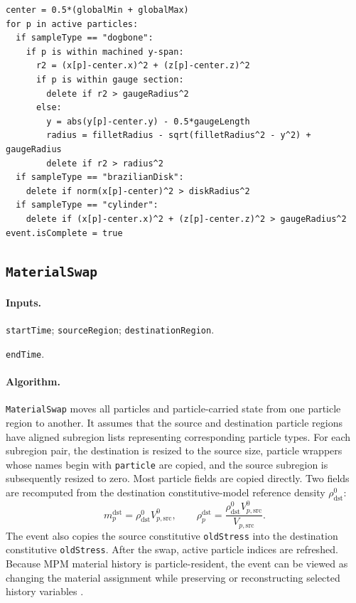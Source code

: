 \begin{lstlisting}[caption={MachineSample event pseudocode.}]
center = 0.5*(globalMin + globalMax)
for p in active particles:
  if sampleType == "dogbone":
    if p is within machined y-span:
      r2 = (x[p]-center.x)^2 + (z[p]-center.z)^2
      if p is within gauge section:
        delete if r2 > gaugeRadius^2
      else:
        y = abs(y[p]-center.y) - 0.5*gaugeLength
        radius = filletRadius - sqrt(filletRadius^2 - y^2) + gaugeRadius
        delete if r2 > radius^2
  if sampleType == "brazilianDisk":
    delete if norm(x[p]-center)^2 > diskRadius^2
  if sampleType == "cylinder":
    delete if (x[p]-center.x)^2 + (z[p]-center.z)^2 > gaugeRadius^2
event.isComplete = true
\end{lstlisting}

\subsection{\texttt{MaterialSwap}}
\label{subsec:event-material-swap}

\paragraph{Inputs.}
\begin{description}[leftmargin=*,style=nextline]
\item[\textbf{Required.}] \texttt{startTime}; \texttt{sourceRegion}; \texttt{destinationRegion}.
\item[\textbf{Optional.}] \texttt{endTime}.
\end{description}

\paragraph{Algorithm.}
\texttt{MaterialSwap} moves all particles and particle-carried state from one particle region to another.  It assumes that the source and destination particle regions have aligned subregion lists representing corresponding particle types.  For each subregion pair, the destination is resized to the source size, particle wrappers whose names begin with \texttt{particle} are copied, and the source subregion is subsequently resized to zero.  Most particle fields are copied directly.  Two fields are recomputed from the destination constitutive-model reference density $\rho^0_{\mathrm{dst}}$:
\begin{equation}
  m^{\mathrm{dst}}_p = \rho^0_{\mathrm{dst}} V^0_{p,\mathrm{src}},
  \qquad
  \rho^{\mathrm{dst}}_p = \frac{\rho^0_{\mathrm{dst}}V^0_{p,\mathrm{src}}}{V_{p,\mathrm{src}}}.
\end{equation}
The event also copies the source constitutive \texttt{oldStress} into the destination constitutive \texttt{oldStress}.  After the swap, active particle indices are refreshed.  Because MPM material history is particle-resident, the event can be viewed as changing the material assignment while preserving or reconstructing selected history variables \cite{sulsky1994history,steffen2008choices}.

